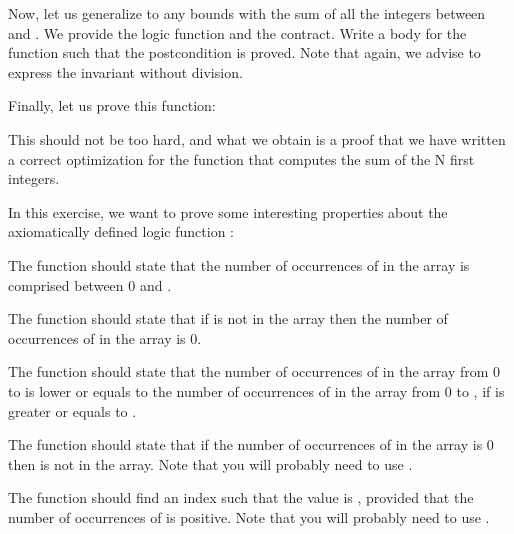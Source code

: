 

Now, let us generalize to any bounds with the sum of all the integers between
 and . We provide the logic function and the
contract. Write a body for the function such that the postcondition is proved.
Note that again, we advise to express the invariant without division.




Finally, let us prove this function:




This should not be too hard, and what we obtain is a proof that we have written
a correct optimization for the function that computes the sum of the N first
integers.




In this exercise, we want to prove some interesting properties about the
axiomatically defined logic function :




The function  should state that the number of
occurrences of  in the array is comprised between 0 and
.


The function  should state that if  is
not in the array then the number of occurrences of  in the array
is 0.


The function  should state that the number of
occurrences of  in the array from 0 to  is lower
or equals to the number of occurrences of  in the array from 0
to , if  is greater or equals to
.


The function  should state that if the number of
occurrences of  in the array is 0 then  is not in
the array. Note that you will probably need to use .


The function  should find an index 
such that the value  is , provided that the
number of occurrences of  is positive. Note that you will
probably need to use .


